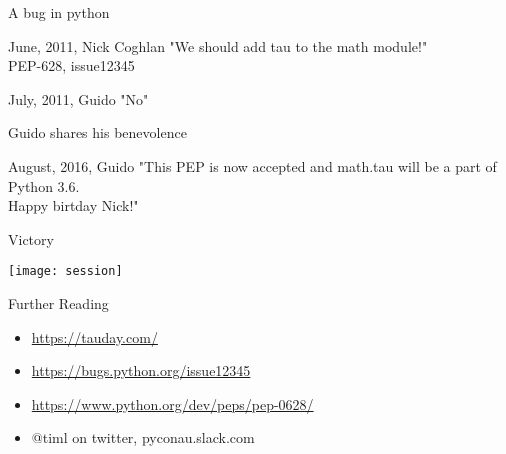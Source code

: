 \documentclass[14pt]{beamer}
\begin{document}
\begin{frame}{A bug in python}
\begin{block}{June, 2011, Nick Coghlan}
"We should add tau to the math module!" \\
PEP-628, issue12345
\end{block}
\begin{alertblock}{July, 2011, Guido}
"No"
\end{alertblock}
\end{frame}

\begin{frame}{Guido shares his benevolence}
\begin{block}{August, 2016, Guido}
"This PEP is now accepted and math.tau will be a part of Python 3.6.\\
Happy birtday Nick!"
\end{block}
\end{frame}

\begin{frame}{Victory}
\begin{center}
\texttt{[image: session]}
\end{center}
\end{frame}

\begin{frame}{Further Reading}
\begin{itemize}
    \item \href{https://tauday.com/}{https://tauday.com/}
    \item \href{https://bugs.python.org/issue12345}{https://bugs.python.org/issue12345}
    \item \href{https://www.python.org/dev/peps/pep-0628/}{https://www.python.org/dev/peps/pep-0628/}
    \item @timl on twitter, pyconau.slack.com
\end{itemize}
\end{frame}
\end{document}
